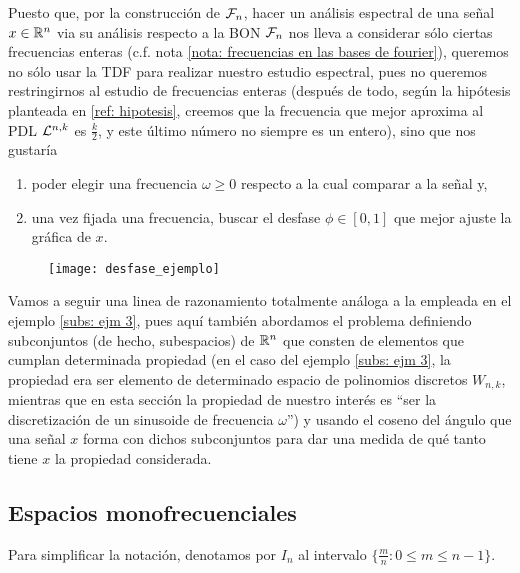 Puesto que, por la construcción de $\mathcal{F}_{n}$, 
hacer un análisis espectral de una señal $x \in \mathbb{R}^{n}$
via su análisis respecto a la BON $\mathcal{F}_{n}$ nos lleva
a considerar sólo ciertas frecuencias enteras
(c.f. nota \ref{nota: frecuencias en las bases de fourier}),
queremos no sólo usar la TDF para realizar
nuestro estudio espectral, pues
no queremos restringirnos
al estudio de frecuencias enteras
(después de todo, según la hipótesis planteada en 
\ref{ref: hipotesis}, 
creemos que la frecuencia que mejor aproxima al PDL
$\mathcal{L}^{n,k}$ es $\frac{k}{2}$, y este último número no siempre
es un entero), sino que nos gustaría
\begin{enumerate}
	\item poder elegir una frecuencia $\omega \geq 0$ respecto
a la cual comparar a la señal y,
	\item una vez fijada una frecuencia, buscar el desfase $\phi \in [0,1]$
	que mejor ajuste la gráfica de $x$.
\end{enumerate}

\begin{figure}[H]
	\centering
	\texttt{[image: desfase\_ejemplo]} 
\end{figure}	


Vamos a seguir
una linea de razonamiento totalmente análoga a la empleada 
en el ejemplo \ref{subs: ejm 3}, pues aquí también abordamos el problema
definiendo subconjuntos (de hecho, subespacios)
de $\mathbb{R}^{n}$ que consten de elementos que cumplan
determinada propiedad (en el caso del ejemplo \ref{subs: ejm 3}, la propiedad
era ser elemento de determinado espacio 
de polinomios discretos $W_{n,k}$, mientras que 
en esta sección la propiedad de nuestro interés es ``ser la discretización
de un sinusoide de frecuencia $\omega$'') y usando el coseno del ángulo que
una señal $x$ forma con dichos subconjuntos para dar una medida de qué tanto
tiene $x$ la propiedad considerada.


\subsection{Espacios monofrecuenciales}

\begin{notacion}
Para simplificar la notación, denotamos por $I_{n}$ al intervalo
$\{ \frac{m}{n}  : 0 \leq m \leq n-1 \}$.
\end{notacion}

